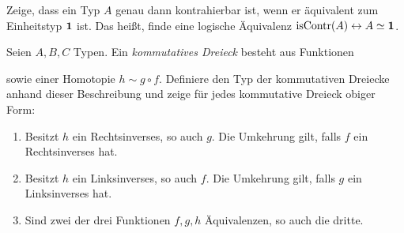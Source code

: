 \documentclass{uebung}
\begin{document}

\begin{exercise}
  Zeige, dass ein Typ $A$ genau dann kontrahierbar ist, wenn er äquivalent zum Einheitstyp $\mathbf{1}$ ist.
  Das heißt, finde eine logische Äquivalenz $\mathrm{isContr}(A)\leftrightarrow A\simeq\mathbf{1}$.
\end{exercise}

\begin{exercise}
  Seien $A,B,C$ Typen.
  Ein \emph{kommutatives Dreieck} besteht aus Funktionen
  \begin{center}
  \end{center}
  sowie einer Homotopie $h\sim g\circ f$.
  Definiere den Typ der kommutativen Dreiecke anhand dieser Beschreibung und zeige für jedes kommutative Dreieck obiger Form:
  \begin{enumerate}
    \item Besitzt $h$ ein Rechtsinverses, so auch $g$.
      Die Umkehrung gilt, falls $f$ ein Rechtsinverses hat.
    \item Besitzt $h$ ein Linksinverses, so auch $f$.
      Die Umkehrung gilt, falls $g$ ein Linksinverses hat.
    \item Sind zwei der drei Funktionen $f,g,h$ Äquivalenzen, so auch die dritte.
  \end{enumerate}
\end{exercise}
\end{document}
